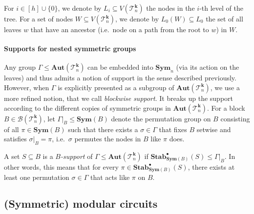 \documentclass[11pt]{article}
\newcommand{\Aut}{\mathbf{Aut}}
\newcommand{\Sym}{\mathbf{Sym}}
\newcommand{\StabP}{\mathbf{Stab}^{\bullet}}
\newcommand{\Bb}{{\mathcal B}}
\newcommand{\Tt}{{\mathcal T}}
\theoremstyle{definition}
\theoremstyle{plain}
\theoremstyle{remark}
\theoremstyle{remark}
\begin{document}
For $i \in [h] \cup \{0\}$, we denote by $L_i \subseteq V(\Tt^{\boldsymbol{k}}_n)$ the nodes in the $i$-th level of the tree. For a set of nodes $W \subseteq V(\Tt^{\boldsymbol{k}}_n)$, we denote by $L_0(W) \subseteq L_0$ the set of all leaves $w$ that have an ancestor (i.e.\ node on a path from the root to $w$) in $W$.


\paragraph*{Supports for nested symmetric groups}
Any group $\Gamma \leq \Aut(\Tt^{\boldsymbol{k}}_n)$ can be embedded into $\Sym_n$ (via its action on the leaves) and thus admits a notion of support in the sense described previously. 
However, when $\Gamma$ is explicitly presented as a subgroup of $\Aut(\Tt^{\boldsymbol{k}}_n)$, we use a more refined notion, that we call \emph{blockwise support}. It breaks up the support according to the different copies of symmetric groups in $\Aut(\Tt^{\boldsymbol{k}}_n)$. 
For a block $B \in \Bb(\Tt_n^{\boldsymbol{k}})$, let $\Gamma|_B \leq \Sym(B)$ denote the permutation group on $B$ consisting of all $\pi \in \Sym(B)$ such that there exists a $\sigma \in \Gamma$ that fixes $B$ setwise and satisfies $\sigma|_B = \pi$, i.e.\ $\sigma$ permutes the nodes in $B$ like $\pi$ does. 

A set $S \subseteq B$ is a \emph{$B$-support} of $\Gamma \leq \Aut(\Tt_n^{\boldsymbol{k}})$ if $\StabP_{\Sym(B)}(S) \leq \Gamma|_B$. In other words, this means that for every $\pi \in \StabP_{\Sym(B)}(S)$, there exists at least one permutation $\sigma \in \Gamma$ that acts like $\pi$ on $B$.



\subsection{(Symmetric) modular circuits}
\end{document}
